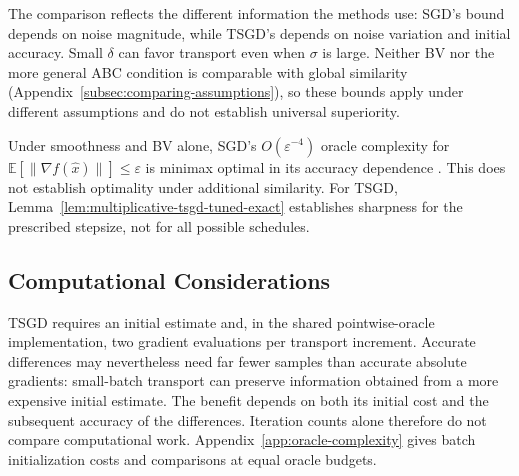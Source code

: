 The comparison reflects the different information the methods use:
SGD's bound depends on noise magnitude, while TSGD's depends on noise
variation and initial accuracy. Small $\delta$ can favor transport even
when $\sigma$ is large. Neither BV nor the more general ABC condition
is comparable with global similarity
(Appendix~\ref{subsec:comparing-assumptions}), so these bounds apply under
different assumptions and do not establish universal superiority.

Under smoothness and BV alone, SGD's $O(\varepsilon^{-4})$ oracle
complexity for $\mathbb E[\|\nabla f(\widehat x)\|]\leq\varepsilon$
is minimax optimal in its accuracy dependence
\citep{arjevani2022lowerboundsnonconvexstochastic}.
This does not establish optimality under additional similarity.
For TSGD, Lemma~\ref{lem:multiplicative-tsgd-tuned-exact} establishes
sharpness for the prescribed stepsize, not for all possible schedules.

\subsection{Computational Considerations}
\label{subsec:computational-considerations}

TSGD requires an initial estimate and, in the shared pointwise-oracle
implementation, two gradient evaluations per transport increment.
Accurate differences may nevertheless need far fewer samples than
accurate absolute gradients: small-batch transport can preserve
information obtained from a more expensive initial estimate. The
benefit depends on both its initial cost and the subsequent accuracy
of the differences. Iteration counts alone therefore do not compare
computational work. Appendix~\ref{app:oracle-complexity} gives batch
initialization costs and comparisons at equal oracle budgets.
